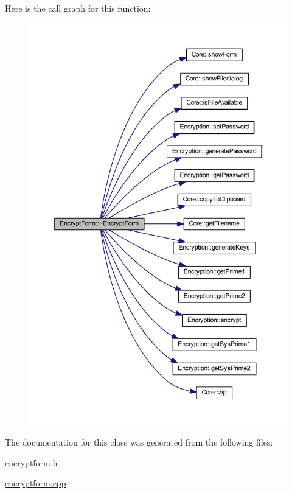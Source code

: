 Here is the call graph for this function\+:
\nopagebreak
\begin{figure}[H]
\begin{center}
\leavevmode
\includegraphics[width=350pt]{class_encrypt_form_ae816abae02f20b132d5eee2033849342_cgraph}
\end{center}
\end{figure}


The documentation for this class was generated from the following files\+:\begin{DoxyCompactItemize}
\item 
\hyperlink{encryptform_8h}{encryptform.\+h}\item 
\hyperlink{encryptform_8cpp}{encryptform.\+cpp}\end{DoxyCompactItemize}
